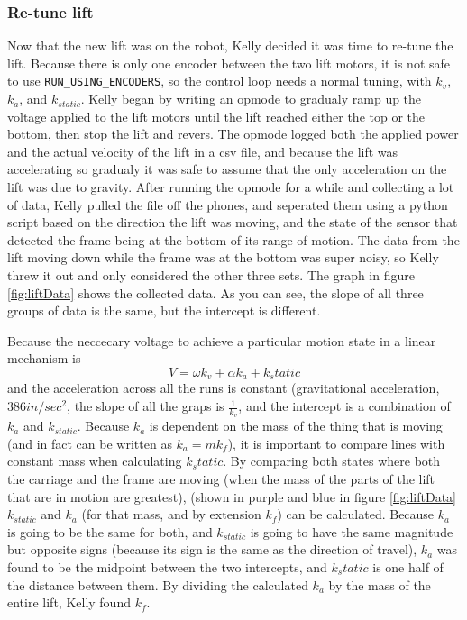 \documentclass{article}
\begin{document}
\subsubsection{Re-tune lift}
Now that the new lift was on the robot, Kelly decided it was time to re-tune the lift. Because there is only one encoder between the two lift motors, it is not safe to use \texttt{RUN\_USING\_ENCODERS}, so the control loop needs a normal tuning, with $k_v$, $k_a$, and $k_{static}$. Kelly began by writing an opmode to gradualy ramp up the voltage applied to the lift motors until the lift reached either the top or the bottom, then stop the lift and revers. The opmode logged both the applied power and the actual velocity of the lift in a csv file, and because the lift was accelerating so gradualy it was safe to assume that the only acceleration on the lift was due to gravity. After running the opmode for a while and collecting a lot of data, Kelly pulled the file off the phones, and seperated them using a python script based on the direction the lift was moving, and the state of the sensor that detected the frame being at the bottom of its range of motion. The data from the lift moving down while the frame was at the bottom was super noisy, so Kelly threw it out and only considered the other three sets. The graph in figure \ref{fig:liftData} shows the collected data. As you can see, the slope of all three groups of data is the same, but the intercept is different. 

Because the neccecary voltage to achieve a particular motion state in a linear mechanism is $$V = \omega k_v + \alpha k_a + k_static$$ 
and the acceleration across all the runs is constant (gravitational acceleration, $386 in/sec^2$, the slope of all the graps is $\frac{1}{k_v}$, and the intercept is a combination of $k_a$ and $k_{static}$. Because $k_a$ is dependent on the mass of the thing that is moving (and in fact can be written as $k_a = m k_f$), it is important to compare lines with constant mass when calculating $k_static$. By comparing both states where both the carriage and the frame are moving (when the mass of the parts of the lift that are in motion are greatest), (shown in purple and blue in figure \ref{fig:liftData} $k_{static}$ and $k_a$ (for that mass, and by extension $k_f$) can be calculated. Because $k_a$ is going to be the same for both, and $k_{static}$ is going to have the same magnitude but opposite signs (because its sign is the same as the direction of travel), $k_a$ was found to be the midpoint between the two intercepts, and $k_static$ is one half of the distance between them. By dividing the calculated $k_a$ by the mass of the entire lift, Kelly found $k_f$. 
\end{document}
